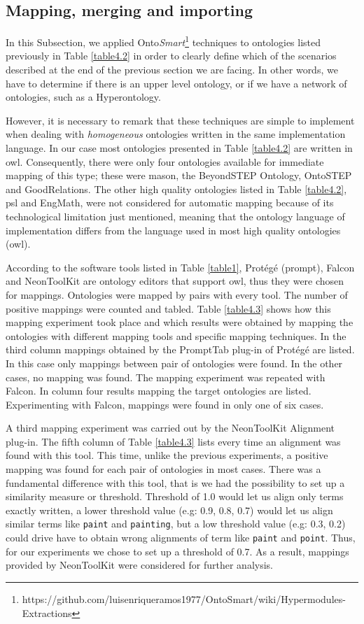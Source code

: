 \subsection{Mapping, merging and importing}\label{subsection4.2.4}

In this Subsection, we applied Onto\textit{Smart}\footnote{https://github.com/luisenriqueramos1977/OntoSmart/wiki/Hypermodules-Extractions} techniques to ontologies listed previously in Table \ref{table4.2}  in order to clearly define which of the scenarios described at the end of the previous section we are facing. In other words, we have to determine if there is an upper level ontology, or if we have a network of ontologies, such as a Hyperontology.

However, it is necessary to remark that these techniques are simple to implement when dealing with \textit{homogeneous} ontologies written in the same implementation language. In our case most ontologies presented in Table \ref{table4.2} are written in \gls{owl}. Consequently, there were only four ontologies available for immediate mapping of this type; these were \gls{mason}, the BeyondSTEP Ontology, OntoSTEP and GoodRelations. The other high quality ontologies listed in Table \ref{table4.2}, \gls{psl} and EngMath, were not considered for automatic mapping because of its technological  limitation just mentioned, meaning that the ontology language of implementation differs from the language used in most high quality ontologies (\gls{owl}). 

According to the software tools listed in Table \ref{table1}, Protégé (prompt), Falcon and NeonToolKit are ontology editors that support \gls{owl}, thus they were chosen for mappings. Ontologies were mapped by pairs with every tool. The number of positive mappings were counted and tabled. Table \ref{table4.3} shows how this mapping experiment took place and which results were obtained by mapping the ontologies with different mapping tools and specific mapping techniques. In the third column mappings obtained by the PromptTab plug-in of Protégé are listed. In this case only mappings between pair of ontologies were found. In the other cases, no mapping was found.  The mapping experiment was repeated with Falcon. In column four results mapping the target ontologies are listed. Experimenting with Falcon, mappings were found in only one of six cases. 

A third mapping experiment was carried out by the NeonToolKit Alignment plug-in. The fifth column of Table \ref{table4.3} lists every time an alignment was found with this tool.  This time, unlike the previous experiments, a positive mapping was found for each pair of ontologies in most cases. There was a fundamental difference with this tool, that is we had the possibility to set up a similarity measure or threshold. Threshold of 1.0 would let us align only terms exactly written, a lower threshold value (e.g: 0.9, 0.8, 0.7) would let us align similar terms like \texttt{paint} and \texttt{painting}, but a low threshold value (e.g: 0.3, 0.2) could drive have to obtain wrong alignments of term like \texttt{paint} and \texttt{point}. Thus, for our experiments we chose to set up a  threshold of 0.7. As a result, mappings provided by NeonToolKit were considered for further analysis.

